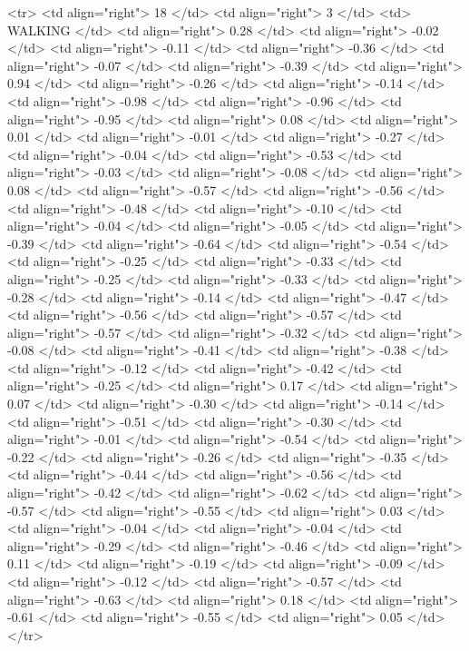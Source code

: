   <tr> <td align="right"> 18 </td> <td align="right">   3 </td> <td> WALKING </td> <td align="right"> 0.28 </td> <td align="right"> -0.02 </td> <td align="right"> -0.11 </td> <td align="right"> -0.36 </td> <td align="right"> -0.07 </td> <td align="right"> -0.39 </td> <td align="right"> 0.94 </td> <td align="right"> -0.26 </td> <td align="right"> -0.14 </td> <td align="right"> -0.98 </td> <td align="right"> -0.96 </td> <td align="right"> -0.95 </td> <td align="right"> 0.08 </td> <td align="right"> 0.01 </td> <td align="right"> -0.01 </td> <td align="right"> -0.27 </td> <td align="right"> -0.04 </td> <td align="right"> -0.53 </td> <td align="right"> -0.03 </td> <td align="right"> -0.08 </td> <td align="right"> 0.08 </td> <td align="right"> -0.57 </td> <td align="right"> -0.56 </td> <td align="right"> -0.48 </td> <td align="right"> -0.10 </td> <td align="right"> -0.04 </td> <td align="right"> -0.05 </td> <td align="right"> -0.39 </td> <td align="right"> -0.64 </td> <td align="right"> -0.54 </td> <td align="right"> -0.25 </td> <td align="right"> -0.33 </td> <td align="right"> -0.25 </td> <td align="right"> -0.33 </td> <td align="right"> -0.28 </td> <td align="right"> -0.14 </td> <td align="right"> -0.47 </td> <td align="right"> -0.56 </td> <td align="right"> -0.57 </td> <td align="right"> -0.57 </td> <td align="right"> -0.32 </td> <td align="right"> -0.08 </td> <td align="right"> -0.41 </td> <td align="right"> -0.38 </td> <td align="right"> -0.12 </td> <td align="right"> -0.42 </td> <td align="right"> -0.25 </td> <td align="right"> 0.17 </td> <td align="right"> 0.07 </td> <td align="right"> -0.30 </td> <td align="right"> -0.14 </td> <td align="right"> -0.51 </td> <td align="right"> -0.30 </td> <td align="right"> -0.01 </td> <td align="right"> -0.54 </td> <td align="right"> -0.22 </td> <td align="right"> -0.26 </td> <td align="right"> -0.35 </td> <td align="right"> -0.44 </td> <td align="right"> -0.56 </td> <td align="right"> -0.42 </td> <td align="right"> -0.62 </td> <td align="right"> -0.57 </td> <td align="right"> -0.55 </td> <td align="right"> 0.03 </td> <td align="right"> -0.04 </td> <td align="right"> -0.04 </td> <td align="right"> -0.29 </td> <td align="right"> -0.46 </td> <td align="right"> 0.11 </td> <td align="right"> -0.19 </td> <td align="right"> -0.09 </td> <td align="right"> -0.12 </td> <td align="right"> -0.57 </td> <td align="right"> -0.63 </td> <td align="right"> 0.18 </td> <td align="right"> -0.61 </td> <td align="right"> -0.55 </td> <td align="right"> 0.05 </td> </tr>
